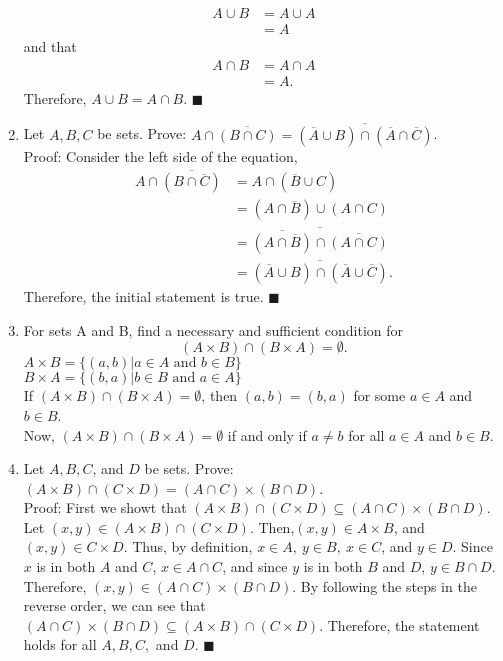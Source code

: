 \documentclass[12pt]{article}
\newcommand{\qed}{\(\blacksquare\)}
\begin{document}
\begin{enumerate}
\begin{equation*}
\begin{split}
                A \cup B &= A\cup A\\
                &=A
            \end{split}
        \end{equation*}
        and that 
        \begin{equation*}
            \begin{split}
                A \cap B &= A \cap A\\
                &=A.
            \end{split}
        \end{equation*}
        Therefore, \(A\cup B= A \cap B\). \qed
        \item Let \(A, B, C\) be sets. Prove: \(A\cap\overline{(B\cap C)} = \overline{(\overline{A}\cup B)\cap(\overline{A}\cap\overline{C})}\).\\Proof: Consider the left side of the equation,
        \begin{equation*}
            \begin{split}
                A\cap \overline{(B\cap \overline{C})}&=A\cap(\overline{B}\cup C)\\
                &=(A\cap \overline{B})\cup(A\cap C)\\
                &=\overline{\overline{(A\cap \overline{B})}\cap\overline{(A\cap C)}}\\
                &= \overline{(\overline{A}\cup B)\cap(\overline{A}\cup\overline{C})}.
            \end{split}
        \end{equation*}
        Therefore, the initial statement is true. \qed
        \item For sets A and B, find a necessary and sufficient condition for
        \begin{equation*}
            (A\times B)\cap(B\times A) = \emptyset.
        \end{equation*}
        \(A\times B =\{(a,b)|a\in A\text{ and }b\in B\}\)\\
        \(B\times A =\{(b,a)|b\in B\text{ and }a\in A\}\)\\
        If \((A\times B)\cap(B\times A) = \emptyset\), then \((a,b)=(b,a)\) for some \(a\in A\) and \(b\in B\).\\
        Now, \((A\times B)\cap(B\times A) = \emptyset\) if and only if \(a\neq b\) for all \(a \in A\) and \(b \in B\). 
        \item Let \(A, B, C\), and \(D\) be sets. Prove: \((A\times B)\cap(C\times D) = (A\cap C)\times (B\cap D)\).\\ Proof: First we showt that \((A\times B)\cap(C\times D)\subseteq (A\cap C)\times (B\cap D)\). Let \((x,y)\in (A\times B)\cap (C\times D)\). Then,\((x,y)\in A\times B\), and \((x,y)\in C\times D\). Thus, by definition, \(x\in A,\ y\in B,\ x\in C\), and \(y\in D\). Since \(x\) is in both \(A\) and \(C\), \(x\in A\cap C\), and since \(y\) is in both \(B\) and \(D\), \(y\in B\cap D\). Therefore, \((x,y)\in(A\cap C)\times(B\cap D)\). By following the steps in the reverse order, we can see that \((A\cap C)\times (B\cap D)\subseteq (A\times B)\cap(C\times D)\). Therefore, the statement holds for all \(A, B, C,\) and \(D\). \qed
    \end{enumerate}
\end{document}

